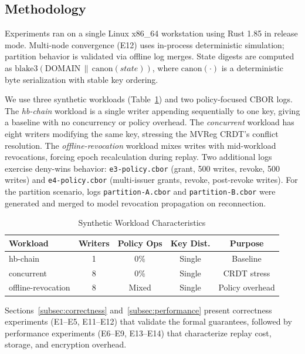 \documentclass[10pt,journal,compsoc]{IEEEtran}
\begin{document}
\subsection{Methodology}\label{subsec:methodology}

Experiments ran on a single Linux x86\_64 workstation using Rust 1.85 in release mode. Multi-node convergence (E12) uses in-process deterministic simulation; partition behavior is validated via offline log merges. State digests are computed as $\mathrm{blake3}(\mathrm{DOMAIN}\,\|\,\mathrm{canon}(\textit{state}))$, where $\mathrm{canon}(\cdot)$ is a deterministic byte serialization with stable key ordering.

We use three synthetic workloads (Table~\ref{tab:workloads}) and two policy-focused CBOR logs. The \emph{hb-chain} workload is a single writer appending sequentially to one key, giving a baseline with no concurrency or policy overhead. The \emph{concurrent} workload has eight writers modifying the same key, stressing the MVReg CRDT's conflict resolution. The \emph{offline-revocation} workload mixes writes with mid-workload revocations, forcing epoch recalculation during replay. Two additional logs exercise deny-wins behavior: \texttt{e3-policy.cbor} (grant, 500 writes, revoke, 500 writes) and \texttt{e4-policy.cbor} (multi-issuer grants, revoke, post-revoke writes). For the partition scenario, logs \texttt{partition-A.cbor} and \texttt{partition-B.cbor} were generated and merged to model revocation propagation on reconnection.

\begin{table}[!htbp]
\centering
\caption{Synthetic Workload Characteristics}
\label{tab:workloads}

\footnotesize
\setlength{\tabcolsep}{4pt}
\renewcommand{\arraystretch}{1.1}

\begin{tabular}{@{}lcccc@{}}
\toprule
\textbf{Workload} & \textbf{Writers} & \textbf{Policy Ops} & \textbf{Key Dist.} & \textbf{Purpose} \\
\midrule
hb-chain                    & 1 & 0\%   & Single & Baseline \\
concurrent                  & 8 & 0\%   & Single & CRDT stress \\
offline-\allowbreak revocation & 8 & Mixed & Single & Policy overhead \\
\bottomrule
\end{tabular}
\end{table}

Sections~\ref{subsec:correctness}
and~\ref{subsec:performance} present correctness experiments
(E1--E5, E11--E12) that validate the formal guarantees, followed
by performance experiments (E6--E9, E13--E14) that characterize
replay cost, storage, and encryption overhead.
\end{document}
